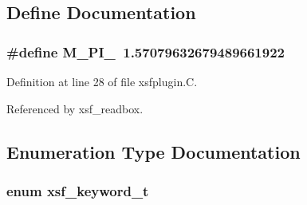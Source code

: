 \subsection{Define Documentation}
\subsubsection{\setlength{\rightskip}{0pt plus 5cm}\#define M\_\-PI\_\ 1.57079632679489661922}\label{xsfplugin_8C_a0}




Definition at line 28 of file xsfplugin.C.

Referenced by xsf\_\-readbox.

\subsection{Enumeration Type Documentation}
\subsubsection{\setlength{\rightskip}{0pt plus 5cm}enum xsf\_\-keyword\_\-t}\label{xsfplugin_8C_a47}


